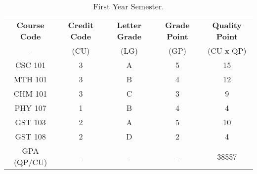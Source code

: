 \documentclass{article}
\begin{document}
\begin{table}[h!]
	\begin{center}
		\caption{First Year Semester.}
		\label{tab:table1}
		\begin{tabular}{c|c|c|c|c} %
			\textbf{Course Code} & \textbf{Credit Code} & \textbf{Letter Grade} & \textbf{Grade Point} & \textbf{Quality Point}\\ - & (CU) & (LG) & (GP) & (CU x QP) \\
			\hline
			CSC 101 & 3 & A & 5 & 15\\
			MTH 101 & 3 & B & 4 & 12\\
			CHM 101 & 3 & C & 3 & 9\\
			PHY 107 & 1 & B & 4 & 4\\
			GST 103 & 2 & A & 5 & 10\\
			GST 108 & 2 & D & 2 & 4\\
			GPA (QP/CU) & - & - & - & 38557
		\end{tabular}
	\end{center}
\end{table}
\end{document}
